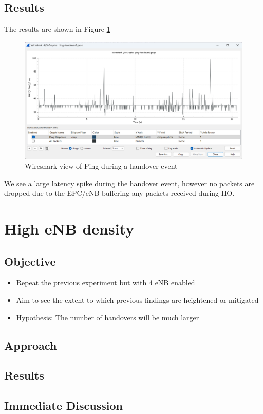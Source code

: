 \subsection{Results}
    The results are shown in Figure \ref{fig:methods:ping-handover}
\begin{figure}
    \centering
    \includegraphics[width=0.75\linewidth]{src//img/ping-handover.png}
    \caption{Wireshark view of Ping during a handover event}
    \label{fig:methods:ping-handover}
\end{figure}
We see a large latency spike during the handover event, however no packets are dropped due to the EPC/eNB buffering any packets received during HO.  

\section{High eNB density}
\subsection{Objective}
\begin{itemize}
    \item Repeat the previous experiment but with 4 eNB enabled
    \item Aim to see the extent to which previous findings are heightened or mitigated
    \item Hypothesis: The number of handovers will be much larger
\end{itemize}
\subsection{Approach}
\subsection{Results}
\subsection{Immediate Discussion}

